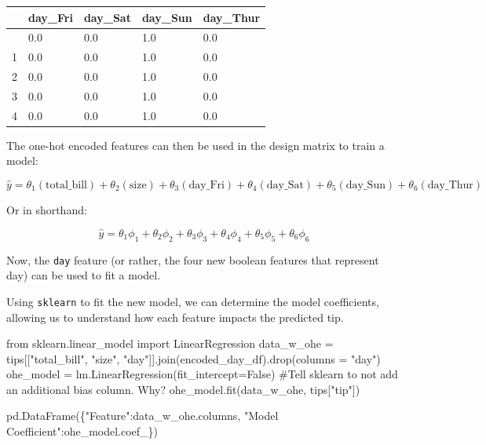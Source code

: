\documentclass[
  letterpaper,
  DIV=11,
  numbers=noendperiod]{scrreprt}
\newenvironment{Shaded}{\begin{snugshade}}{\end{snugshade}}
\newcommand{\CommentTok}[1]{\textcolor[rgb]{0.37,0.37,0.37}{#1}}
\newcommand{\ImportTok}[1]{\textcolor[rgb]{0.00,0.46,0.62}{#1}}
\newcommand{\NormalTok}[1]{\textcolor[rgb]{0.00,0.23,0.31}{#1}}
\newcommand{\OperatorTok}[1]{\textcolor[rgb]{0.37,0.37,0.37}{#1}}
\newcommand{\StringTok}[1]{\textcolor[rgb]{0.13,0.47,0.30}{#1}}
\newcommand{\VariableTok}[1]{\textcolor[rgb]{0.07,0.07,0.07}{#1}}
\begin{document}
\begin{longtable}[]{@{}lllll@{}}
\toprule\noalign{}
& day\_Fri & day\_Sat & day\_Sun & day\_Thur \\
\midrule\noalign{}
\endhead
\bottomrule\noalign{}
\endlastfoot
0 & 0.0 & 0.0 & 1.0 & 0.0 \\
1 & 0.0 & 0.0 & 1.0 & 0.0 \\
2 & 0.0 & 0.0 & 1.0 & 0.0 \\
3 & 0.0 & 0.0 & 1.0 & 0.0 \\
4 & 0.0 & 0.0 & 1.0 & 0.0 \\
\end{longtable}

The one-hot encoded features can then be used in the design matrix to
train a model:

\[\hat{y} = \theta_1 (\text{total}\_\text{bill}) + \theta_2 (\text{size}) + \theta_3 (\text{day}\_\text{Fri}) + \theta_4 (\text{day}\_\text{Sat}) + \theta_5 (\text{day}\_\text{Sun}) + \theta_6 (\text{day}\_\text{Thur})\]

Or in shorthand:

\[\hat{y} = \theta_{1}\phi_{1} + \theta_{2}\phi_{2} + \theta_{3}\phi_{3} + \theta_{4}\phi_{4} + \theta_{5}\phi_{5} + \theta_{6}\phi_{6}\]

Now, the \texttt{day} feature (or rather, the four new boolean features
that represent day) can be used to fit a model.

Using \texttt{sklearn} to fit the new model, we can determine the model
coefficients, allowing us to understand how each feature impacts the
predicted tip.

\begin{Shaded}
\begin{Highlighting}[]
\ImportTok{from}\NormalTok{ sklearn.linear\_model }\ImportTok{import}\NormalTok{ LinearRegression}
\NormalTok{data\_w\_ohe }\OperatorTok{=}\NormalTok{ tips[[}\StringTok{"total\_bill"}\NormalTok{, }\StringTok{"size"}\NormalTok{, }\StringTok{"day"}\NormalTok{]].join(encoded\_day\_df).drop(columns }\OperatorTok{=} \StringTok{"day"}\NormalTok{)}
\NormalTok{ohe\_model }\OperatorTok{=}\NormalTok{ lm.LinearRegression(fit\_intercept}\OperatorTok{=}\VariableTok{False}\NormalTok{) }\CommentTok{\#Tell sklearn to not add an additional bias column. Why?}
\NormalTok{ohe\_model.fit(data\_w\_ohe, tips[}\StringTok{"tip"}\NormalTok{])}

\NormalTok{pd.DataFrame(\{}\StringTok{"Feature"}\NormalTok{:data\_w\_ohe.columns, }\StringTok{"Model Coefficient"}\NormalTok{:ohe\_model.coef\_\})}
\end{Highlighting}
\end{Shaded}
\end{document}
